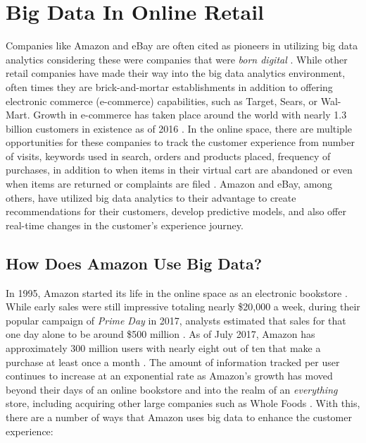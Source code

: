 \documentclass[sigconf]{acmart}
\begin{document}
\section{Big Data In Online Retail}
Companies like Amazon and eBay are often cited as pioneers in utilizing big data analytics considering these were companies that were \textit{born digital} \cite{Akter2016}. While other retail companies have made their way into the big data analytics environment, often times they are brick-and-mortar establishments in addition to offering electronic commerce (e-commerce) capabilities, such as Target, Sears, or Wal-Mart. Growth in e-commerce has taken place around the world with nearly 1.3 billion customers in existence as of 2016 \cite{Akter2016}. In the online space, there are multiple opportunities for these companies to track the customer experience from number of visits, keywords used in search, orders and products placed, frequency of purchases, in addition to when items in their virtual cart are abandoned or even when items are returned or complaints are filed \cite{Akter2016}. Amazon and eBay, among others, have utilized big data analytics to their advantage to create recommendations for their customers, develop predictive models, and also offer real-time changes in the customer's experience journey. 

  \subsection{How Does Amazon Use Big Data?}
  In 1995, Amazon started its life in the online space as an electronic bookstore \cite{Hartmans2017}. While early sales were still impressive totaling nearly \$20,000 a week, during their popular campaign of \textit{Prime Day} in 2017, analysts estimated that sales for that one day alone to be around \$500 million \cite{Smith2017}. As of July 2017, Amazon has approximately 300 million users with nearly eight out of ten that make a purchase at least once a month \cite{Smith2017}. The amount of information tracked per user continues to increase at an exponential rate as Amazon's growth has moved beyond their days of an online bookstore and into the realm of an \textit{everything} store, including acquiring other large companies such as Whole Foods \cite{Petro2017}. With this, there are a number of ways that Amazon uses big data to enhance the customer experience:
  
\end{document}
